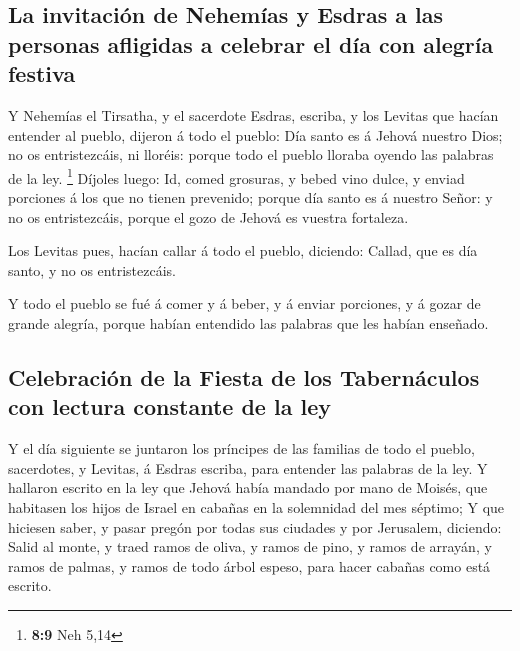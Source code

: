 \hypertarget{la-invitaciuxf3n-de-nehemuxedas-y-esdras-a-las-personas-afligidas-a-celebrar-el-duxeda-con-alegruxeda-festiva}{%
\subsection{La invitación de Nehemías y Esdras a las personas afligidas
a celebrar el día con alegría
festiva}\label{la-invitaciuxf3n-de-nehemuxedas-y-esdras-a-las-personas-afligidas-a-celebrar-el-duxeda-con-alegruxeda-festiva}}

 Y Nehemías el Tirsatha, y el sacerdote Esdras, escriba, y
los Levitas que hacían entender al pueblo, dijeron á todo el pueblo: Día
santo es á Jehová nuestro Dios; no os entristezcáis, ni lloréis: porque
todo el pueblo lloraba oyendo las palabras de la ley. \footnote{\textbf{8:9}
  Neh 5,14}  Díjoles luego: Id, comed grosuras, y bebed
vino dulce, y enviad porciones á los que no tienen prevenido; porque día
santo es á nuestro Señor: y no os entristezcáis, porque el gozo de
Jehová es vuestra fortaleza.

 Los Levitas pues, hacían callar á todo el pueblo,
diciendo: Callad, que es día santo, y no os entristezcáis.

 Y todo el pueblo se fué á comer y á beber, y á enviar
porciones, y á gozar de grande alegría, porque habían entendido las
palabras que les habían enseñado.

\hypertarget{celebraciuxf3n-de-la-fiesta-de-los-tabernuxe1culos-con-lectura-constante-de-la-ley}{%
\subsection{Celebración de la Fiesta de los Tabernáculos con lectura
constante de la
ley}\label{celebraciuxf3n-de-la-fiesta-de-los-tabernuxe1culos-con-lectura-constante-de-la-ley}}

 Y el día siguiente se juntaron los príncipes de las
familias de todo el pueblo, sacerdotes, y Levitas, á Esdras escriba,
para entender las palabras de la ley.  Y hallaron escrito
en la ley que Jehová había mandado por mano de Moisés, que habitasen los
hijos de Israel en cabañas en la solemnidad del mes séptimo;
 Y que hiciesen saber, y pasar pregón por todas sus
ciudades y por Jerusalem, diciendo: Salid al monte, y traed ramos de
oliva, y ramos de pino, y ramos de arrayán, y ramos de palmas, y ramos
de todo árbol espeso, para hacer cabañas como está escrito.


